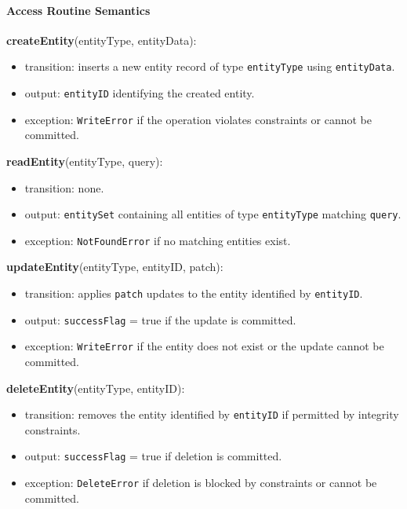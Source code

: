 \documentclass[12pt, titlepage]{article}
\begin{document}
\begin{itemize}
  \paragraph{Access Routine Semantics}

  \noindent \textbf{createEntity}(entityType, entityData):
  \begin{itemize}
    \item transition: inserts a new entity record of type \texttt{entityType} using \texttt{entityData}.
    \item output: \texttt{entityID} identifying the created entity.
    \item exception: \texttt{WriteError} if the operation violates constraints or cannot be committed.
  \end{itemize}

  \noindent \textbf{readEntity}(entityType, query):
  \begin{itemize}
    \item transition: none.
    \item output: \texttt{entitySet} containing all entities of type \texttt{entityType} matching \texttt{query}.
    \item exception: \texttt{NotFoundError} if no matching entities exist.
  \end{itemize}

  \noindent \textbf{updateEntity}(entityType, entityID, patch):
  \begin{itemize}
    \item transition: applies \texttt{patch} updates to the entity identified by \texttt{entityID}.
    \item output: \texttt{successFlag} = true if the update is committed.
    \item exception: \texttt{WriteError} if the entity does not exist or the update cannot be committed.
  \end{itemize}

  \noindent \textbf{deleteEntity}(entityType, entityID):
  \begin{itemize}
    \item transition: removes the entity identified by \texttt{entityID} if permitted by integrity constraints.
    \item output: \texttt{successFlag} = true if deletion is committed.
    \item exception: \texttt{DeleteError} if deletion is blocked by constraints or cannot be committed.
  \end{itemize}


\end{itemize}
\end{document}
